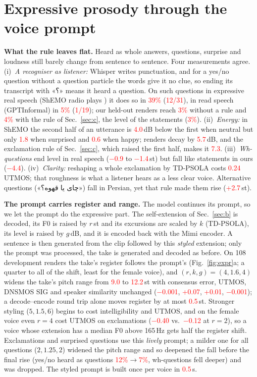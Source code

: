\documentclass[conference]{IEEEtran}
\newcommand{\fa}[1]{{\persianfont\beginR #1\endR}}
\newcommand{\RES}[1]{\textcolor{red}{#1}}
\begin{document}
\section{Expressive prosody through the voice prompt}\label{sec:d}
\textbf{What the rule leaves flat.} Heard as whole answers, questions, surprise and loudness still barely
change from sentence to sentence. Four measurements agree. (i)~\emph{A recogniser as listener:} Whisper
writes punctuation, and for a yes/no question without a question particle the words give it no clue, so
ending its transcript with \fa{«؟»} means it heard a question. On such questions in expressive real speech
(ShEMO radio plays \cite{shemo2019}) it does so in \RES{39\%} (\RES{12/31}), in read speech (GPTInformal)
in \RES{5\%} (\RES{1/19}); our held-out renders reach \RES{3\%} without a rule and \RES{4\%} with the rule
of Sec.~\ref{sec:c}, the level of the statements (\RES{3\%}). (ii)~\emph{Energy:} in ShEMO the second half
of an utterance is \RES{4.0}\,dB below the first when neutral but only \RES{1.8} when surprised and
\RES{0.6} when happy; renders decay by \RES{5.7}\,dB, and the exclamation rule of Sec.~\ref{sec:c}, which
raised the first half, makes it \RES{7.3}. (iii)~\emph{Wh-questions} end level in real speech (\RES{$-$0.9}
to \RES{$-$1.4}\,st) but fall like statements in ours (\RES{$-$4.4}). (iv)~\emph{Clarity:} reshaping a whole
exclamation by TD-PSOLA costs \RES{0.24} UTMOS; that roughness is what a listener hears as a less clear voice.
Alternative questions (\fa{«چای یا قهوه؟»}) fall in Persian, yet that rule made them rise (\RES{+2.7}\,st).

\textbf{The prompt carries register and range.} The model continues its prompt, so we let the prompt do
the expressive part. The self-extension of Sec.~\ref{sec:b} is decoded, its F0 is raised by $r$\,st and its
excursions are scaled by $k$ (TD-PSOLA), its level is raised by $g$\,dB, and it is encoded back with the
Mimi encoder. A sentence is then generated from the clip followed by this \emph{styled} extension; only the
prompt was processed, the take is generated and decoded as before. On 108 development renders the take's
register follows the prompt's (Fig.~\ref{fig:expr}a; a quarter to all of the shift, least for the female
voice), and $(r,k,g)=(4,1.6,4)$
widens the take's pitch range from \RES{9.0} to \RES{12.2}\,st with consensus error, UTMOS, DNSMOS SIG
\cite{dnsmos2022} and speaker similarity unchanged (\RES{$-$0.001}, \RES{+0.07}, \RES{+0.01},
\RES{$-$0.001}); a decode--encode round trip alone moves register by at most \RES{0.5}\,st. Stronger
styling ($5,1.5,6$) begins to cost intelligibility and UTMOS, and on the female voice even $r=4$ cost
UTMOS on exclamations (\RES{$-$0.40} vs.\ \RES{$-$0.12} at $r=2$), so a voice whose extension has a median
F0 above 165\,Hz gets half the register shift. Exclamations and surprised questions use this
\emph{lively} prompt; a milder one for all questions ($2,1.25,2$) widened the pitch range and so deepened the
fall before the final rise (yes/no heard as questions \RES{12\%}$\to$\RES{7\%}, wh-questions fell deeper)
and was dropped. The styled prompt is built once per voice in \RES{0.5}\,s.
\end{document}
